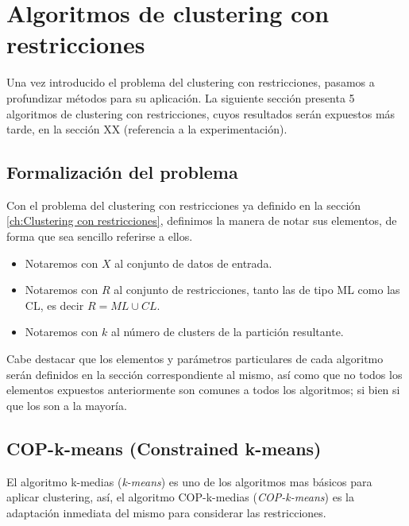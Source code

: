 \chapter{Algoritmos de clustering con restricciones}\label{ch:Algoritmos de clustering con restricciones}

Una vez introducido el problema del clustering con restricciones, pasamos a profundizar métodos para su aplicación. La siguiente sección presenta 5 algoritmos de clustering con restricciones, cuyos resultados serán expuestos más tarde, en la sección XX (referencia a la experimentación).

\section{Formalización del problema}

Con el problema del clustering con restricciones ya definido en la sección \ref{ch:Clustering con restricciones}, definimos la manera de notar sus elementos, de forma que sea sencillo referirse a ellos.

\begin{itemize}
	
	\item Notaremos con $X$ al conjunto de datos de entrada.
	
	\item Notaremos con $R$ al conjunto de restricciones, tanto las de tipo \acs{ML} como las \acs{CL}, es decir $R = ML \cup CL$. 
	
	\item Notaremos con $k$ al número de clusters de la partición resultante.
	
\end{itemize}

Cabe destacar que los elementos y parámetros particulares de cada algoritmo serán definidos en la sección correspondiente al mismo, así como que no todos los elementos expuestos anteriormente son comunes a todos los algoritmos; si bien si que los son a la mayoría.

\section{COP-k-means (Constrained k-means)}

El algoritmo k-medias (\textit{k-means}) es uno de los algoritmos mas básicos para aplicar clustering, así, el algoritmo COP-k-medias (\textit{COP-k-means}) es la adaptación inmediata del mismo para considerar las restricciones.

